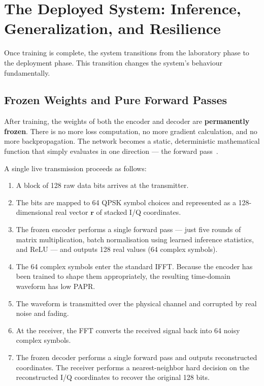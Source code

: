 \section{The Deployed System: Inference, Generalization, and Resilience}

Once training is complete, the system transitions from the laboratory phase to the deployment phase. This transition changes the system's behaviour fundamentally.


\subsection{Frozen Weights and Pure Forward Passes}

After training, the weights of both the encoder and decoder are \textbf{permanently frozen}.  There is no more loss computation, no more gradient calculation, and no more backpropagation.  The network becomes a static, deterministic mathematical function that simply evaluates in one direction --- the forward pass~\cite{kim2017novel}.

A single live transmission proceeds as follows:
\begin{enumerate}
    \item A block of 128 raw data bits arrives at the transmitter.
    \item The bits are mapped to 64 QPSK symbol choices and represented as a 128-dimensional real vector $\bm{r}$ of stacked I/Q coordinates.
    \item The frozen encoder performs a single forward pass --- just five rounds of matrix multiplication, batch normalisation using learned inference statistics, and ReLU --- and outputs 128 real values (64 complex symbols).
    \item The 64 complex symbols enter the standard IFFT.  Because the encoder has been trained to shape them appropriately, the resulting time-domain waveform has low PAPR.
    \item The waveform is transmitted over the physical channel and corrupted by real noise and fading.
    \item At the receiver, the FFT converts the received signal back into 64 noisy complex symbols.
    \item The frozen decoder performs a single forward pass and outputs reconstructed coordinates.  The receiver performs a nearest-neighbor hard decision on the reconstructed I/Q coordinates to recover the original 128 bits.
\end{enumerate}

